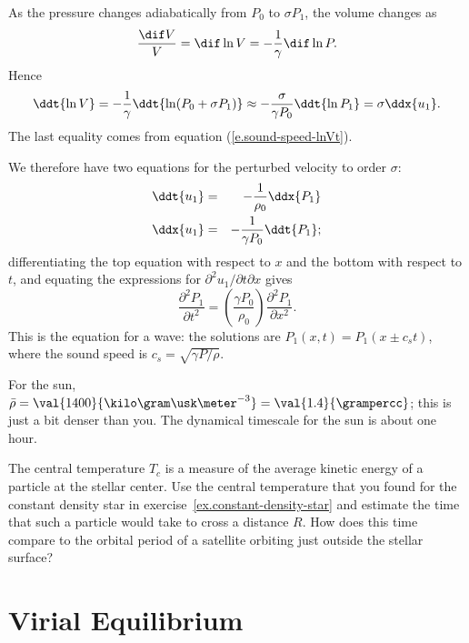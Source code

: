 \begin{sidebar}
As the pressure changes adiabatically from $P_{0}$ to $\sigma P_{1}$, the volume changes as
\[
	\frac{\dif V}{V} = \dif\ln V = -\frac{1}{\gamma}\dif\ln P.
\]
Hence
\begin{equation}\label{e.sound-speed-lnVt-2}
	\ddt{\ln V} = -\frac{1}{\gamma}\ddt{\ln (P_{0} + \sigma P_{1})} \approx 
		-\frac{\sigma}{\gamma P_{0}}\ddt{\ln P_{1}} = \sigma \ddx{u_{1}}.
\end{equation}
The last equality comes from equation (\ref{e.sound-speed-lnVt}).

We therefore have two equations for the perturbed velocity to order $\sigma$:
\begin{eqnarray*}
\ddt{u_{1}} &=& -\frac{1}{\rho_{0}} \ddx{P_{1}}\\
\ddx{u_{1}} &=& -\frac{1}{\gamma P_{0}} \ddt{P_{1}};
\end{eqnarray*}
differentiating the top equation with respect to $x$ and the bottom with respect to $t$, and equating the expressions for $\partial^{2}u_{1}/\partial t\partial x$ gives
\begin{equation}\label{e.sound-speed}
\frac{\partial^{2} P_{1}}{\partial t^{2}} = \left(\frac{\gamma P_{0}}{\rho_{0}}\right)
	\frac{\partial^{2} P_{1}}{\partial x^{2}}.
\end{equation}
This is the equation for a wave: the solutions are $P_{1}(x,t) = P_{1}(x\pm c_{s}t)$, where the sound speed is $c_{s} = \sqrt{\gamma P/\rho}$.
\end{sidebar}

For the sun, $\bar{\rho} = \val{1400}{\kilo\gram\usk\meter^{-3}} = \val{1.4}{\grampercc}$; this is just a bit denser than you.  The dynamical timescale for the sun is about one hour.

\begin{exercisebox}
The central temperature $T_{c}$ is a measure of the average kinetic energy of a particle at the stellar center. Use the central temperature that you found for the constant density star in exercise~\ref{ex.constant-density-star} and estimate the time that such a particle would take to cross a distance $R$. How does this time compare to the orbital period of a satellite orbiting just outside the stellar surface?
\end{exercisebox}

\section{Virial Equilibrium}
\label{s.virial-equilibrium}

